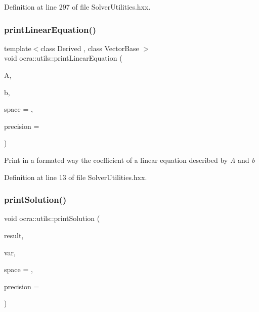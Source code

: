 Definition at line 297 of file Solver\+Utilities.\+hxx.

\hypertarget{namespaceocra_1_1utils_aaf649f13f39cd8d32b0311ac2bfe2b4d}{}\label{namespaceocra_1_1utils_aaf649f13f39cd8d32b0311ac2bfe2b4d} 
\subsubsection{\texorpdfstring{print\+Linear\+Equation()}{printLinearEquation()}}
{\footnotesize\ttfamily template$<$class Derived , class Vector\+Base $>$ \\
void ocra\+::utils\+::print\+Linear\+Equation (\begin{DoxyParamCaption}\item[{const Matrix\+Base$<$ Derived $>$ \&}]{A,  }\item[{const Vector\+Base \&}]{b,  }\item[{int}]{space = {},  }\item[{int}]{precision = {} }\end{DoxyParamCaption})\hspace{0.3cm}{\ttfamily [inline]}}

Print in a formated way the coefficient of a linear equation described by {\itshape A} and {\itshape b} 

Definition at line 13 of file Solver\+Utilities.\+hxx.

\hypertarget{namespaceocra_1_1utils_aa928598a03da10c32b029f77c571788a}{}\label{namespaceocra_1_1utils_aa928598a03da10c32b029f77c571788a} 
\subsubsection{\texorpdfstring{print\+Solution()}{printSolution()}}
{\footnotesize\ttfamily void ocra\+::utils\+::print\+Solution (\begin{DoxyParamCaption}\item[{const Vector\+Xd \&}]{result,  }\item[{const \hyperlink{classocra_1_1Variable}{Variable} \&}]{var,  }\item[{int}]{space = {},  }\item[{int}]{precision = {} }\end{DoxyParamCaption})}


